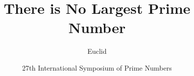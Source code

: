 \documentclass{beamer}
\title{There is No Largest Prime Number}
\date[ISPN '80]{27th International Symposium of Prime Numbers}
\author{Euclid}{Eculid of Alexandria \texttt{eculid@alexandria.edu}}
\begin{document}
\begin{frame}
  \titlepage
\end{frame}
\end{document}

